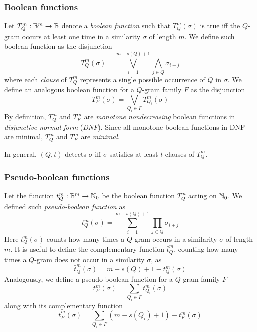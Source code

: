 \subsubsection{Boolean functions}

Let $T_{Q}^{m}: \mathbb {B}^m \rightarrow \mathbb {B}$ denote a \emph{boolean function} such that $T_{Q}^{m}(\sigma)$ is true iff the $Q$-gram occurs at least one time in a similarity $\sigma$ of length $m$.
We define such boolean function as the disjunction
\begin{equation}
\label{eq:qgram-bool}
T_{Q}^{m}(\sigma) = \bigvee_{i=1}^{m-s(Q)+1} \bigwedge_{j \in Q} \sigma_{i+j}
\end{equation}
where each \emph{clause} of $T_{Q}^{m}$ represents a single possible occurrence of $Q$ in $\sigma$.
We define an analogous boolean function for a $Q$-gram family $F$ as the disjunction
\begin{equation}
\label{eq:family-bool}
T_{F}^{m}(\sigma) = \bigvee_{Q_i \in F} T_{Q_i}^{m}(\sigma)
\end{equation}
By definition, $T_{Q}^{m}$ and $T_{F}^{m}$ are \emph{monotone nondecreasing} boolean functions in \emph{disjunctive normal form} (\emph{DNF}).
Since all monotone boolean functions in DNF are minimal, $T_{Q}^{m}$ and $T_{F}^{m}$ are \emph{minimal}.

In general, $(Q,t)$ detects $\sigma$ iff $\sigma$ satisfies at least $t$ clauses of $T_{Q}^{m}$.

\subsubsection{Pseudo-boolean functions}

Let the function $t_{Q}^{m}: \mathbb {B}^m \rightarrow \mathbb {N}_0$ be the boolean function $T_{Q}^{m}$ acting on $\mathbb {N}_0$.
We defined such \emph{pseudo-boolean function} as
\begin{equation}
\label{eq:qgram-pseudo}
t_{Q}^{m}(\sigma) = \sum_{i=1}^{m-s(Q)+1} \prod_{j \in Q}\sigma_{i+j}
\end{equation}
Here $t_{Q}^{m}(\sigma)$ counts how many times a $Q$-gram occurs in a similarity $\sigma$ of length $m$.
It is useful to define the complementary function $\bar{t}_{Q}^{m}$, counting how many times a $Q$-gram does not occur in a similarity $\sigma$, as
\begin{equation}
\label{eq:qgram-pseudoneg}
\bar{t}_{Q}^{m}(\sigma) = m - s(Q) + 1 - t_{Q}^{m}(\sigma)
\end{equation}
Analogously, we define a pseudo-boolean function for a $Q$-gram family $F$
\begin{equation}
\label{eq:family-pseudo}
t_{F}^{m}(\sigma) = \sum_{Q_i \in F} t_{Q_i}^{m}(\sigma)
\end{equation}
along with its complementary function
\begin{equation}
\label{eq:family-pseudoneg}
\bar{t}_{F}^{m}(\sigma) = \sum_{Q_i \in F}{(m - s(Q_i) + 1)} - t_{F}^{m}(\sigma)
\end{equation}

